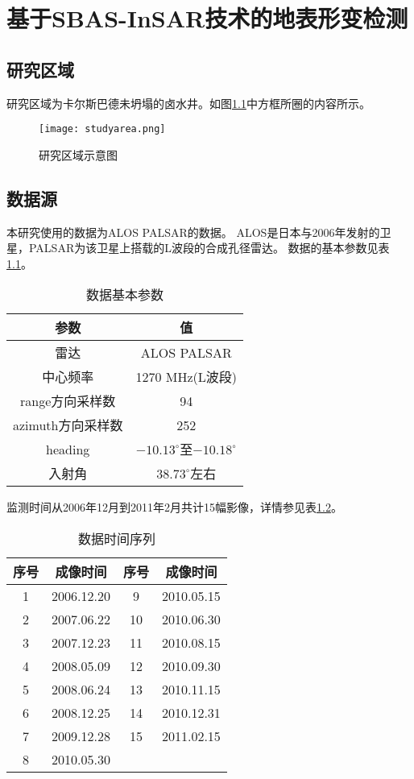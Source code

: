 \chapter{基于SBAS-InSAR技术的地表形变检测}

\section{研究区域}

研究区域为卡尔斯巴德未坍塌的卤水井。如图\ref{fig:studyarea}中方框所圈的内容所示。
\begin{figure}[htb]
    \centering
    \texttt{[image: studyarea.png]}
    \caption{研究区域示意图}
    \label{fig:studyarea}
\end{figure}

\section{数据源}

本研究使用的数据为ALOS PALSAR的数据。
ALOS是日本与2006年发射的卫星，PALSAR为该卫星上搭载的L波段的合成孔径雷达。
数据的基本参数见表\ref{tab:palsar}。
\begin{table}[htb]
    \centering\small
    \caption{数据基本参数}
    \label{tab:palsar}
    \begin{tabular}{@{}cc@{}}
    \toprule
    参数           & 值                                \\ 
    \midrule
    雷达           & ALOS PALSAR                      \\
    中心频率         & 1270 MHz(L波段)                    \\
    range方向采样数   & 94                               \\
    azimuth方向采样数 & 252                              \\
    heading      & $-10.13^{\circ}$至$-10.18^{\circ}$ \\
    入射角          & $38.73^{\circ}$左右  \\
    \bottomrule
    \end{tabular}
\end{table}
监测时间从2006年12月到2011年2月共计15幅影像，详情参见表\ref{tab:timeseries}。
\begin{table}[htb]
    \centering\small
    \caption{数据时间序列}
    \label{tab:timeseries}
    \begin{tabular}{@{}cccc@{}}
    \toprule
    序号 & 成像时间 & 序号 & 成像时间\\ 
    \midrule
    1 & 2006.12.20 & 9 & 2010.05.15 \\
    2 & 2007.06.22 & 10 & 2010.06.30 \\
    3 & 2007.12.23 & 11 & 2010.08.15 \\
    4 & 2008.05.09 & 12 & 2010.09.30 \\
    5 & 2008.06.24 & 13 & 2010.11.15 \\
    6 & 2008.12.25 & 14 & 2010.12.31 \\
    7 & 2009.12.28 & 15 & 2011.02.15 \\
    8 & 2010.05.30 & & \\
    \bottomrule
    \end{tabular}
\end{table}
